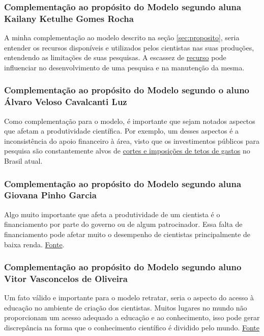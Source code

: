 \subsubsection{Complementação ao propósito do Modelo segundo aluna Kailany Ketulhe Gomes Rocha}

A minha complementação ao modelo descrito na seção \ref{sec:proposito}, seria entender os recursos disponíveis e utilizados pelos cientistas nas suas produções, entendendo as limitações de suas pesquisas. A escassez de
\href{https://conexao.ufrj.br/2019/02/escassez-de-verbas-corroi-pesquisa-cientifica-nacional/}{recurso} pode influenciar no desenvolvimento de uma pesquisa e na manutenção da mesma.

\subsubsection{Complementação ao propósito do Modelo segundo o aluno Álvaro Veloso Cavalcanti Luz}

Como complementação para o modelo, é importante que sejam notados aspectos que afetam a produtividade científica. Por exemplo, um desses aspectos é a inconsistência do apoio financeiro à área, visto que os investimentos públicos para pesquisa são constantemente alvos de \href{https://www.redebrasilatual.com.br/educacao/2021/04/educacao-e-a-area-mais-atingida-pelos-cortes-orcamentarios-de-bolsonaro/} {cortes e imposições de tetos de gastos} no Brasil atual.

\subsubsection{Complementação ao propósito do Modelo segundo aluna Giovana Pinho Garcia}
Algo muito importante que afeta a produtividade de um cientista é o financiamento por parte do governo ou de algum patrocinador. Essa falta de financiamento pode afetar muito o desempenho de cientistas principalmente de baixa renda. \href{https://www.ufg.br/n/129177-baixo-investimento-em-ciencia-e-tecnologia-eleva-a-desigualdade-social}{Fonte}.

\subsubsection{Complementação ao propósito do Modelo segundo aluno Vitor Vasconcelos de Oliveira}
Um fato válido e importante para o modelo retratar, seria o aspecto do acesso à educação no ambiente de criação dos cientistas. Muitos lugares no mundo não proporcionam um acesso adequado a educação e ao conhecimento, isso pode gerar discrepância na forma que o conhecimento científico é dividido pelo mundo.
\href{https://www.senado.gov.br/noticias/Jornal/emdiscussao/inovacao/pesquisa-ciencia-tecnologia-e-inovacao-educacao/caminho-para-o-conhecimento-cientifico-e-a-inovacao-tecnologica-no-pais-ensino-de-ciencias-nas-escolas-e-desafio-para-alunos-e-professores-do-brasil.aspx}{Fonte}

